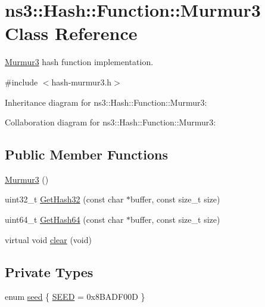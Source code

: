 \hypertarget{classns3_1_1Hash_1_1Function_1_1Murmur3}{}\section{ns3\+:\+:Hash\+:\+:Function\+:\+:Murmur3 Class Reference}
\label{classns3_1_1Hash_1_1Function_1_1Murmur3}


\hyperlink{classns3_1_1Hash_1_1Function_1_1Murmur3}{Murmur3} hash function implementation.  




{\ttfamily \#include $<$hash-\/murmur3.\+h$>$}



Inheritance diagram for ns3\+:\+:Hash\+:\+:Function\+:\+:Murmur3\+:


Collaboration diagram for ns3\+:\+:Hash\+:\+:Function\+:\+:Murmur3\+:
\subsection*{Public Member Functions}
\begin{DoxyCompactItemize}
\item 
\hyperlink{classns3_1_1Hash_1_1Function_1_1Murmur3_a1307ee7bf3cc36782f964c0d2dbe1d80}{Murmur3} ()
\item 
uint32\+\_\+t \hyperlink{classns3_1_1Hash_1_1Function_1_1Murmur3_a0639182fa8bd469749a6d444d172ca19}{Get\+Hash32} (const char $\ast$buffer, const size\+\_\+t size)
\item 
uint64\+\_\+t \hyperlink{classns3_1_1Hash_1_1Function_1_1Murmur3_a94d6e2f8fcf78b63851f4a39a90a614d}{Get\+Hash64} (const char $\ast$buffer, const size\+\_\+t size)
\item 
virtual void \hyperlink{classns3_1_1Hash_1_1Function_1_1Murmur3_a1a8ba08bd81c47cbf774939f63a14bac}{clear} (void)
\end{DoxyCompactItemize}
\subsection*{Private Types}
\begin{DoxyCompactItemize}
\item 
enum \hyperlink{classns3_1_1Hash_1_1Function_1_1Murmur3_a63d58e837fd38ec83842fbd72f224b81}{seed} \{ \hyperlink{classns3_1_1Hash_1_1Function_1_1Murmur3_a63d58e837fd38ec83842fbd72f224b81a7d541e2a9b411726f66ac1ea28574e13}{S\+E\+ED} = 0x8\+B\+A\+D\+F00D
 \}
\end{DoxyCompactItemize}
